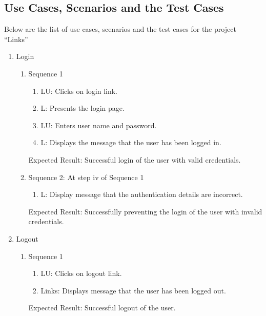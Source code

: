 \documentclass[11pt]{report} %
\begin{document}
\subsection*{Use Cases, Scenarios and the Test Cases}
Below are the list of use cases, scenarios and the test cases for the project ``Links''
\begin{enumerate}

\item
	Login
		\begin{enumerate}
			\item
				Sequence 1
					\begin{enumerate}
						\item
							LU: Clicks on login link.
						\item
							L: Presents the login page.
						\item
							LU: Enters user name and password.
						\item
							L: Displays the message that the user has been logged in.
					\end{enumerate}
					
			Expected Result: Successful login of the user with valid credentials.
			\item
				Sequence 2: At step iv of Sequence 1
					\begin{enumerate}
						\item
							L: Display message that the authentication details are incorrect.						
					\end{enumerate}
				Expected Result: Successfully preventing the login of the user with invalid credentials.
		\end{enumerate}

\item
	Logout
		\begin{enumerate}
			\item
				Sequence 1
					\begin{enumerate}
						\item
							LU: Clicks on logout link.
						\item
							Links: Displays message that the user has been logged out.			
					\end{enumerate}
				Expected Result: Successful logout of the user.
		\end{enumerate}


\end{enumerate}
\end{document}

